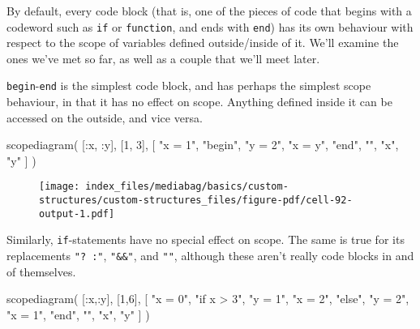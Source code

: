 \documentclass[
  letterpaper,
  DIV=11,
  numbers=noendperiod]{scrreprt}
\newenvironment{Shaded}{\begin{snugshade}}{\end{snugshade}}
\newcommand{\FloatTok}[1]{\textcolor[rgb]{0.68,0.00,0.00}{#1}}
\newcommand{\FunctionTok}[1]{\textcolor[rgb]{0.28,0.35,0.67}{#1}}
\newcommand{\NormalTok}[1]{\textcolor[rgb]{0.00,0.23,0.31}{#1}}
\newcommand{\OperatorTok}[1]{\textcolor[rgb]{0.37,0.37,0.37}{#1}}
\newcommand{\StringTok}[1]{\textcolor[rgb]{0.13,0.47,0.30}{#1}}
\begin{document}
By default, every code block (that is, one of the pieces of code that
begins with a codeword such as \texttt{if} or \texttt{function}, and
ends with \texttt{end}) has its own behaviour with respect to the scope
of variables defined outside/inside of it. We'll examine the ones we've
met so far, as well as a couple that we'll meet later.

\texttt{begin}-\texttt{end} is the simplest code block, and has perhaps
the simplest scope behaviour, in that it has no effect on scope.
Anything defined inside it can be accessed on the outside, and vice
versa.

\begin{Shaded}
\begin{Highlighting}[]
\FunctionTok{scopediagram}\NormalTok{(}
\NormalTok{    [}\OperatorTok{:}\NormalTok{x, }\OperatorTok{:}\NormalTok{y], [}\FloatTok{1}\NormalTok{, }\FloatTok{3}\NormalTok{],}
\NormalTok{    [}
        \StringTok{"x = 1"}\NormalTok{,}
        \StringTok{"begin"}\NormalTok{,}
        \StringTok{"y = 2"}\NormalTok{,}
        \StringTok{"x = y"}\NormalTok{,}
        \StringTok{"end"}\NormalTok{,}
        \StringTok{""}\NormalTok{,}
        \StringTok{"x"}\NormalTok{,}
        \StringTok{"y"}
\NormalTok{    ]}
\NormalTok{)}
\end{Highlighting}
\end{Shaded}

\begin{figure}[H]

{\centering \texttt{[image: index\_files/mediabag/basics/custom-structures/custom-structures\_files/figure-pdf/cell-92-output-1.pdf]}

}

\end{figure}

Similarly, \texttt{if}-statements have no special effect on scope. The
same is true for its replacements \texttt{"?\ :"}, \texttt{"\&\&"}, and
\texttt{"\textbar{}\textbar{}"}, although these aren't really code
blocks in and of themselves.

\begin{Shaded}
\begin{Highlighting}[]
\FunctionTok{scopediagram}\NormalTok{(}
\NormalTok{    [}\OperatorTok{:}\NormalTok{x,}\OperatorTok{:}\NormalTok{y], [}\FloatTok{1}\NormalTok{,}\FloatTok{6}\NormalTok{],}
\NormalTok{    [}
        \StringTok{"x = 0"}\NormalTok{,}
        \StringTok{"if x \textgreater{} 3"}\NormalTok{,}
        \StringTok{"y = 1"}\NormalTok{,}
        \StringTok{"x = 2"}\NormalTok{,}
        \StringTok{"else"}\NormalTok{,}
        \StringTok{"y = 2"}\NormalTok{,}
        \StringTok{"x = 1"}\NormalTok{,}
        \StringTok{"end"}\NormalTok{,}
        \StringTok{""}\NormalTok{,}
        \StringTok{"x"}\NormalTok{,}
        \StringTok{"y"}
\NormalTok{    ]}
\NormalTok{)}
\end{Highlighting}
\end{Shaded}
\end{document}

